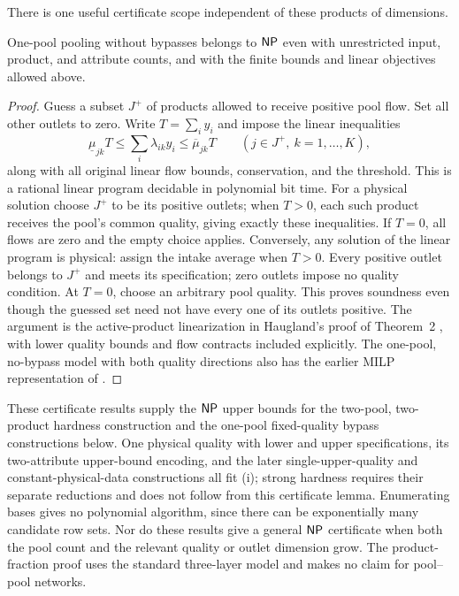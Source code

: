 There is one useful certificate scope independent of these products
of dimensions.
\begin{proposition}\label{s2:no-bypass-np}
One-pool pooling without bypasses belongs to $\mathsf{NP}$ even with
unrestricted input, product, and attribute counts, and with the finite
bounds and linear objectives allowed above.
\end{proposition}
\begin{proof}
Guess a subset $J^+$ of products allowed to receive positive pool flow.
Set all other outlets to zero. Write $T=\sum_i y_i$ and impose the
linear inequalities
\[
 \underline\mu_{jk}T\le\sum_i\lambda_{ik}y_i
   \le\overline\mu_{jk}T\qquad(j\in J^+,\ k=1,\ldots,K),
\]
along with all original linear flow bounds, conservation, and the
threshold. This is a rational linear program decidable in polynomial
bit time. For a physical solution choose $J^+$ to be its positive
outlets; when $T>0$, each such product receives the pool's common
quality, giving exactly these inequalities. If $T=0$, all flows are
zero and the empty choice applies. Conversely, any solution of the
linear program is physical: assign the intake average when $T>0$.
Every positive outlet belongs to $J^+$ and meets its specification;
zero outlets impose no quality condition. At $T=0$, choose an arbitrary
pool quality. This proves soundness even though the guessed set need
not have every one of its outlets positive. The argument is the
active-product linearization in Haugland's proof of Theorem~2
\citep{haugland2016-the-computational-complexity-of-the}, with lower
quality bounds and flow contracts included explicitly.
The one-pool, no-bypass model with both quality directions also has
the earlier MILP representation of
\citet[electronic companion, Appendix~A]{dey2015-analysis-of-milp-techniques-for}.
\end{proof}

These certificate results supply the $\mathsf{NP}$ upper bounds for the
two-pool, two-product hardness construction and the one-pool
fixed-quality bypass constructions below. One physical quality with
lower and upper specifications, its two-attribute upper-bound encoding,
and the later single-upper-quality and constant-physical-data
constructions all fit (i); strong hardness requires their separate
reductions and does not follow from this certificate lemma. Enumerating
bases gives no polynomial algorithm, since there can be exponentially
many candidate row sets. Nor do these results give a general $\mathsf{NP}$
certificate when both the pool count and the relevant quality or outlet
dimension grow. The product-fraction proof uses the standard three-layer
model and makes no claim for pool--pool networks.
